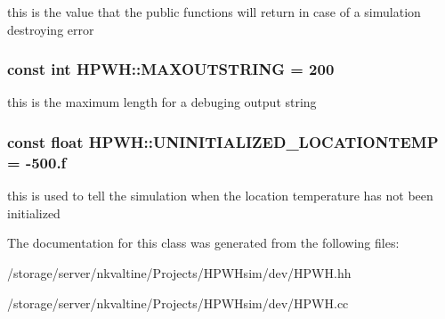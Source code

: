 this is the value that the public functions will return in case of a simulation destroying error \hypertarget{class_h_p_w_h_aee834cec1de7483ecf642d310a7da75f}{
\subsubsection[{M\-A\-X\-O\-U\-T\-S\-T\-R\-I\-N\-G}]{\setlength{\rightskip}{0pt plus 5cm}const int H\-P\-W\-H\-::\-M\-A\-X\-O\-U\-T\-S\-T\-R\-I\-N\-G = 200\hspace{0.3cm}{\ttfamily [static]}}}\label{class_h_p_w_h_aee834cec1de7483ecf642d310a7da75f}
this is the maximum length for a debuging output string \hypertarget{class_h_p_w_h_aaa8fb3333f8cb5caf7ef0c92d3d8f998}{
\subsubsection[{U\-N\-I\-N\-I\-T\-I\-A\-L\-I\-Z\-E\-D\-\_\-\-L\-O\-C\-A\-T\-I\-O\-N\-T\-E\-M\-P}]{\setlength{\rightskip}{0pt plus 5cm}const float H\-P\-W\-H\-::\-U\-N\-I\-N\-I\-T\-I\-A\-L\-I\-Z\-E\-D\-\_\-\-L\-O\-C\-A\-T\-I\-O\-N\-T\-E\-M\-P = -\/500.f\hspace{0.3cm}{\ttfamily [static]}}}\label{class_h_p_w_h_aaa8fb3333f8cb5caf7ef0c92d3d8f998}
this is used to tell the simulation when the location temperature has not been initialized 

The documentation for this class was generated from the following files\-:\begin{DoxyCompactItemize}
\item 
/storage/server/nkvaltine/\-Projects/\-H\-P\-W\-Hsim/dev/H\-P\-W\-H.\-hh\item 
/storage/server/nkvaltine/\-Projects/\-H\-P\-W\-Hsim/dev/H\-P\-W\-H.\-cc\end{DoxyCompactItemize}
